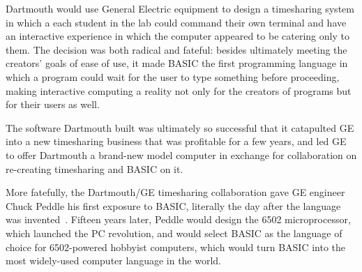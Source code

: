 Dartmouth would use General Electric equipment to design a timesharing
system in which a each student in the lab could command their own
terminal and have an interactive experience in which the computer
appeared to be catering only to them.
The decision was both radical and fateful: besides ultimately meeting
the creators' goals of ease of use, it made BASIC the first programming
language in which a program could wait for the user to type
something before proceeding, making interactive computing a reality not
only for the creators of programs but for their users as well.

The software Dartmouth built was ultimately so successful that it
catapulted GE into a new timesharing business that was profitable for a
few years, and led GE to offer Dartmouth a brand-new model computer in
exchange for collaboration on re-creating timesharing and BASIC on it.
 
More fatefully, the Dartmouth/GE timesharing collaboration
gave GE engineer Chuck Peddle his first exposure to
BASIC, literally the day after the language was
invented~\cite[p.~5]{commodore}.
Fifteen years later, Peddle would design the 6502 microprocessor, which launched
the PC revolution, and would select BASIC as the language of choice for
6502-powered hobbyist computers, which would turn BASIC into the most
widely-used computer language in the world.





